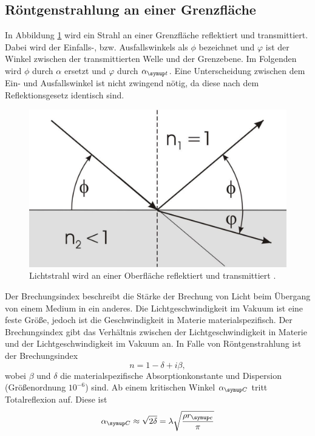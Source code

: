 \subsection{Röntgenstrahlung an einer Grenzfläche}
In Abbildung \ref{fig:reflection_transmission} wird ein Strahl an einer Grenzfläche reflektiert und transmittiert. Dabei 
wird der Einfalls-, bzw. Ausfallswinkels als $\phi$ bezeichnet und $\varphi$ ist der Winkel zwischen der transmittierten Welle und der Grenzebene.
Im Folgenden wird $\phi$ durch $\alpha$ ersetzt und $\varphi$ durch $\alpha\idx{t}$. Eine Unterscheidung zwischen dem Ein- und Ausfallswinkel ist 
nicht zwingend nötig, da diese nach dem Reflektionsgesetz identisch sind.
\begin{figure}[H]
  \centering
  \includegraphics[scale=0.25]{rt.pdf}
  \caption{Lichtstrahl wird an einer Oberfläche reflektiert und transmittiert \cite{uni_giessen}.}
  \label{fig:reflection_transmission}
\end{figure} 
\noindent
Der Brechungsindex beschreibt die Stärke der Brechung von Licht
beim Übergang von einem Medium in ein anderes. Die Lichtgeschwindigkeit im Vakuum
ist eine feste Größe, jedoch ist die Geschwindigkeit in Materie materialspezifisch. Der
Brechungsindex gibt das Verhältnis zwischen der Lichtgeschwindigkeit in Materie und
der Lichtgeschwindigkeit im Vakuum an.
In Falle von Röntgenstrahlung ist der Brechungsindex
\begin{equation}
  n= 1 - \delta + i \beta , 
\end{equation}
wobei $\beta$ und $\delta$ die materialspezifische Absorptionkonstante und Dispersion (Größenordnung $10^{-6}$) sind.
Ab einem kritischen Winkel $\alpha\idx{C}$ tritt Totalreflexion auf. Diese ist 
\begin{equation*}
  \alpha\idx{C} \approx \sqrt{2 \delta} = \lambda \sqrt{\frac{\rho r\idx{e}}{\pi}}
\end{equation*}

